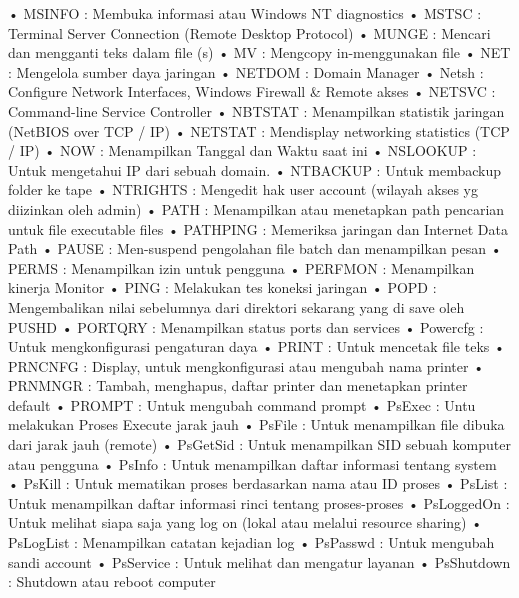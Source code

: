 \documentclass{article}
\begin{document}
• MSINFO : Membuka informasi atau Windows NT diagnostics
• MSTSC : Terminal Server Connection (Remote Desktop Protocol)
• MUNGE : Mencari dan mengganti teks dalam file (s)
• MV : Mengcopy in-menggunakan file
• NET : Mengelola sumber daya jaringan
• NETDOM : Domain Manager
• Netsh : Configure Network Interfaces, Windows Firewall & Remote akses
• NETSVC : Command-line Service Controller
• NBTSTAT : Menampilkan statistik jaringan (NetBIOS over TCP / IP)
• NETSTAT : Mendisplay networking statistics (TCP / IP)
• NOW : Menampilkan  Tanggal dan Waktu saat ini
• NSLOOKUP : Untuk mengetahui IP dari sebuah domain.
• NTBACKUP : Untuk membackup  folder ke tape
• NTRIGHTS : Mengedit hak user account (wilayah akses yg diizinkan oleh admin)
• PATH : Menampilkan atau menetapkan path pencarian untuk file executable files
• PATHPING : Memeriksa jaringan dan Internet Data Path
• PAUSE : Men-suspend pengolahan file batch dan menampilkan pesan
• PERMS : Menampilkan izin untuk pengguna
• PERFMON : Menampilkan kinerja Monitor
• PING : Melakukan tes koneksi jaringan
• POPD : Mengembalikan nilai sebelumnya dari direktori sekarang yang di save oleh PUSHD
• PORTQRY : Menampilkan status ports dan services
• Powercfg : Untuk mengkonfigurasi pengaturan daya
• PRINT : Untuk mencetak file teks
• PRNCNFG : Display, untuk mengkonfigurasi atau mengubah nama printer
• PRNMNGR : Tambah, menghapus, daftar printer dan menetapkan printer default
• PROMPT : Untuk mengubah command prompt
• PsExec : Untu melakukan Proses Execute jarak jauh
• PsFile : Untuk menampilkan file dibuka dari jarak jauh (remote)
• PsGetSid : Untuk menampilkan SID sebuah komputer atau pengguna
• PsInfo : Untuk menampilkan daftar informasi tentang system
• PsKill : Untuk mematikan proses berdasarkan nama atau ID proses
• PsList : Untuk menampilkan daftar informasi rinci tentang proses-proses
• PsLoggedOn : Untuk melihat siapa saja yang log on (lokal atau melalui resource sharing)
• PsLogList : Menampilkan catatan kejadian log
• PsPasswd : Untuk mengubah sandi account
• PsService : Untuk melihat dan mengatur layanan
• PsShutdown : Shutdown atau reboot computer
\end{document}
